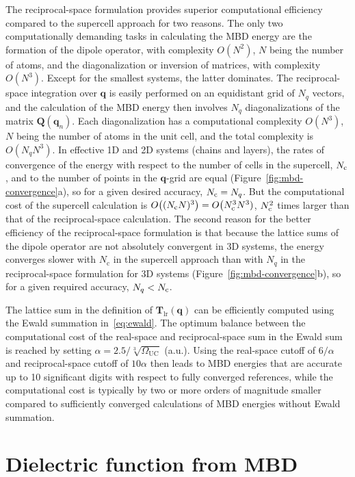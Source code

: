 The reciprocal-space formulation provides superior computational efficiency compared to the supercell approach for two reasons.
The only two computationally demanding tasks in calculating the MBD energy are the formation of the dipole operator, with complexity $O(N^2)$, $N$ being the number of atoms, and the diagonalization or inversion of matrices, with complexity $O(N^3)$.
Except for the smallest systems, the latter dominates.
The reciprocal-space integration over $\mathbf q$ is easily performed on an equidistant grid of $N_q$ vectors, and the calculation of the MBD energy then involves $N_q$ diagonalizations of the matrix $\mathbf Q(\mathbf q_n)$.
Each diagonalization has a computational complexity $O(N^3)$, $N$ being the number of atoms in the unit cell, and the total complexity is $O(N_q N^3)$.
In effective 1D and 2D systems (chains and layers), the rates of convergence of the energy with respect to the number of cells in the supercell, $N_\text c$, and to the number of points in the $\mathbf q$-grid are equal (Figure~\ref{fig:mbd-convergence}a), so for a given desired accuracy, $N_\text c=N_q$.
But the computational cost of the supercell calculation is $O\big((N_\text cN)^3\big)=O\big(N_\text c^3N^3)$, $N_\text c^2$ times larger than that of the reciprocal-space calculation.
The second reason for the better efficiency of the reciprocal-space formulation is that because the lattice sums of the dipole operator are not absolutely convergent in 3D systems, the energy converges slower with $N_\text{c}$ in the supercell approach than with $N_q$ in the reciprocal-space formulation for 3D systems (Figure~\ref{fig:mbd-convergence}b), so for a given required accuracy, $N_q<N_\text c$.

The lattice sum in the definition of $\mathbf T_\text{lr}(\mathbf q)$ can be efficiently computed using the Ewald summation in~\eqref{eq:ewald}.
The optimum balance between the computational cost of the real-space and reciprocal-space sum in the Ewald sum is reached by setting $\alpha=2.5/\sqrt[3]{\Omega_\text{UC}}$ (a.u.).
Using the real-space cutoff of $6/\alpha$ and reciprocal-space cutoff of $10\alpha$ then leads to MBD energies that are accurate up to 10 significant digits with respect to fully converged references, while the computational cost is typically by two or more orders of magnitude smaller compared to sufficiently converged calculations of MBD energies without Ewald summation.

\section{Dielectric function from MBD}

